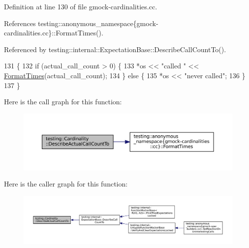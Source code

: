Definition at line 130 of file gmock-\/cardinalities.\+cc.



References testing\+::anonymous\+\_\+namespace\{gmock-\/cardinalities.\+cc\}\+::\+Format\+Times().



Referenced by testing\+::internal\+::\+Expectation\+Base\+::\+Describe\+Call\+Count\+To().


\begin{DoxyCode}
131                                                             \{
132   \textcolor{keywordflow}{if} (actual\_call\_count > 0) \{
133     *os << \textcolor{stringliteral}{"called "} << \hyperlink{namespacetesting_1_1anonymous__namespace_02gmock-cardinalities_8cc_03_a96225757688584c7c21d9a120bc74fd4}{FormatTimes}(actual\_call\_count);
134   \} \textcolor{keywordflow}{else} \{
135     *os << \textcolor{stringliteral}{"never called"};
136   \}
137 \}
\end{DoxyCode}
Here is the call graph for this function\+:
\nopagebreak
\begin{figure}[H]
\begin{center}
\leavevmode
\includegraphics[width=350pt]{classtesting_1_1Cardinality_a7cbea339e2f3072a98367e087aa296e8_cgraph}
\end{center}
\end{figure}
Here is the caller graph for this function\+:
\nopagebreak
\begin{figure}[H]
\begin{center}
\leavevmode
\includegraphics[width=350pt]{classtesting_1_1Cardinality_a7cbea339e2f3072a98367e087aa296e8_icgraph}
\end{center}
\end{figure}
\mbox{\label{classtesting_1_1Cardinality_a2955f4b65022c422f56e79b767c4fa71}} 
